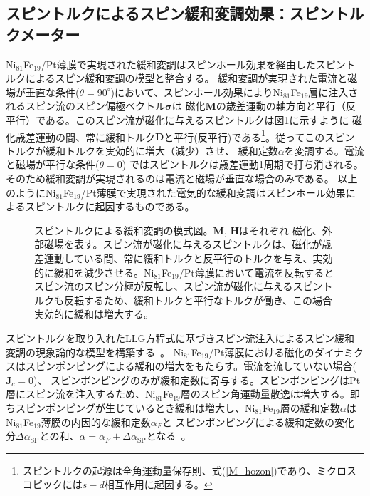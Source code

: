 \subsection{スピントルクによるスピン緩和変調効果：スピントルクメーター}




Ni$_{81}$Fe$_{19}$/Pt薄膜で実現された緩和変調はスピンホール効果を経由したスピントルクによるスピン緩和変調の模型と整合する。
緩和変調が実現された電流と磁場が垂直な条件($\theta=90^\circ$)において、スピンホール効果によりNi$_{81}$Fe$_{19}$層に注入されるスピン流のスピン偏極ベクトル$\bm{\sigma}$は
磁化${\bm M}$の歳差運動の軸方向と平行（反平行）である。このスピン流が磁化に与えるスピントルクは図\ref{spinHall_spintorque2}に示すように
磁化歳差運動の間、常に緩和トルク${\bm D}$と平行(反平行)である\footnote{スピントルクの起源は全角運動量保存則、式(\ref{M_hozon})であり、ミクロスコピックには$s-d$相互作用に起因する。}。従ってこのスピントルクが緩和トルクを実効的に増大（減少）させ、
緩和定数$\alpha$を変調する。電流と磁場が平行な条件($\theta=0$)
ではスピントルクは歳差運動1周期で打ち消される。そのため緩和変調が実現されるのは電流と磁場が垂直な場合のみである。
以上のようにNi$_{81}$Fe$_{19}$/Pt薄膜で実現された電気的な緩和変調はスピンホール効果によるスピントルクに起因するものである。


\begin{figure}[htbp]
 \begin{center}
 \caption{スピントルクによる緩和変調の模式図。$\bm{M}$, $\bm{H}$はそれぞれ
磁化、外部磁場を表す。スピン流が磁化に与えるスピントルクは、磁化が歳差運動している間、常に緩和トルクと反平行のトルクを与え、実効的に緩和を減少させる。Ni$_{81}$Fe$_{19}$/Pt薄膜において電流を反転するとスピン流のスピン分極が反転し、スピン流が磁化に与えるスピントルクも反転するため、緩和トルクと平行なトルクが働き、この場合実効的に緩和は増大する。
}
 \label{spinHall_spintorque2}
 \end{center}
\end{figure}




スピントルクを取り入れたLLG方程式に基づきスピン流注入によるスピン緩和変調の現象論的な模型を構築する~\cite{AndoPRL}。
Ni$_{81}$Fe$_{19}$/Pt薄膜における磁化のダイナミクスはスピンポンピングによる緩和の増大をもたらす。電流を流していない場合($\bm{J}_c=0$)、
スピンポンピングのみが緩和定数に寄与する。スピンポンピングはPt層にスピン流を注入するため、Ni$_{81}$Fe$_{19}$層のスピン角運動量散逸は増大する。即ちスピンポンピングが生じているとき緩和は増大し、Ni$_{81}$Fe$_{19}$層の緩和定数$\alpha$はNi$_{81}$Fe$_{19}$薄膜の内因的な緩和定数$\alpha_F$と
スピンポンピングによる緩和定数の変化分$\Delta \alpha_\text{SP}$との和、$\alpha=\alpha_F+\Delta \alpha_\text{SP}$となる~\cite{Tserkovnyak1,Mizukami}。


